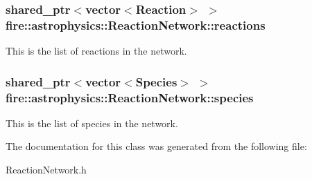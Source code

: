 \subsubsection[{\texorpdfstring{reactions}{reactions}}]{\setlength{\rightskip}{0pt plus 5cm}shared\+\_\+ptr$<$vector$<${\bf Reaction}$>$ $>$ fire\+::astrophysics\+::\+Reaction\+Network\+::reactions}\hypertarget{a00243_a32964b6f6a9cb312e722c1478167b7f0}{}\label{a00243_a32964b6f6a9cb312e722c1478167b7f0}
This is the list of reactions in the network. 
\subsubsection[{\texorpdfstring{species}{species}}]{\setlength{\rightskip}{0pt plus 5cm}shared\+\_\+ptr$<$vector$<${\bf Species}$>$ $>$ fire\+::astrophysics\+::\+Reaction\+Network\+::species}\hypertarget{a00243_ac3811889f4866a29a49ce3a8d0e80cad}{}\label{a00243_ac3811889f4866a29a49ce3a8d0e80cad}
This is the list of species in the network. 

The documentation for this class was generated from the following file\+:\begin{DoxyCompactItemize}
\item 
Reaction\+Network.\+h\end{DoxyCompactItemize}
